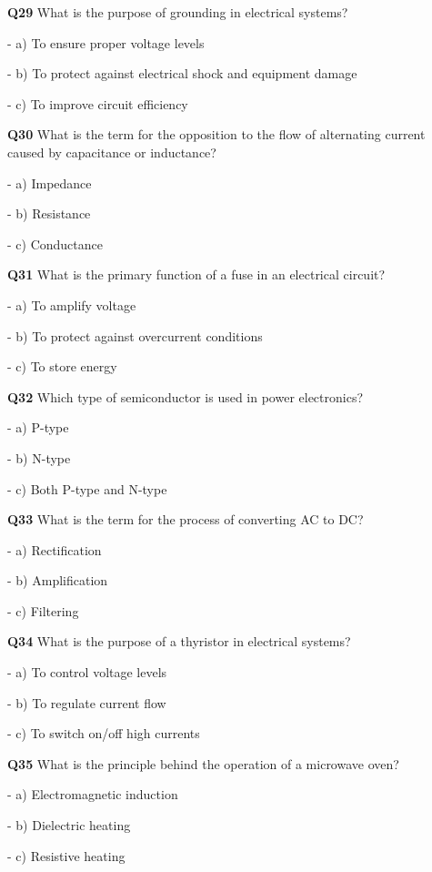 \textbf{Q29} What is the purpose of grounding in electrical systems?\par
\quad - a) To ensure proper voltage levels\par
\quad - b) To protect against electrical shock and equipment damage\par
\quad - c) To improve circuit efficiency\par

\textbf{Q30} What is the term for the opposition to the flow of alternating current caused by capacitance or inductance?\par
\quad - a) Impedance\par
\quad - b) Resistance\par
\quad - c) Conductance\par

\textbf{Q31} What is the primary function of a fuse in an electrical circuit?\par
\quad - a) To amplify voltage\par
\quad - b) To protect against overcurrent conditions\par
\quad - c) To store energy\par

\textbf{Q32} Which type of semiconductor is used in power electronics?\par
\quad - a) P-type\par
\quad - b) N-type\par
\quad - c) Both P-type and N-type\par

\textbf{Q33} What is the term for the process of converting AC to DC?\par
\quad - a) Rectification\par
\quad - b) Amplification\par
\quad - c) Filtering\par

\textbf{Q34} What is the purpose of a thyristor in electrical systems?\par
\quad - a) To control voltage levels\par
\quad - b) To regulate current flow\par
\quad - c) To switch on/off high currents\par

\textbf{Q35} What is the principle behind the operation of a microwave oven?\par
\quad - a) Electromagnetic induction\par
\quad - b) Dielectric heating\par
\quad - c) Resistive heating\par

